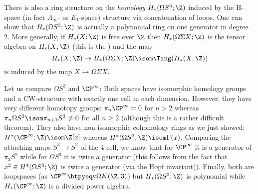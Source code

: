 \begin{remark}
	There is also a ring structure on the \emph{homology} $H_*(\Omega S^3; \Z)$ induced by the H-space (in fact $A_\infty$- or $E_1$-space) structure via concatenation of loops.
	One can show that $H_*(\Omega S^3; \Z)$ is actually a polynomial ring on one generator in degree 2.
	More generally, if $H_*(X; \Z)$ is free over $\Z$ then $H_*(\Omega \Sigma X; \Z)$ is the tensor algebra on $H_*(X; \Z)$ (this is the ) and the map
	\begin{equation*}
		H_*(X; \Z) \to H_*(\Omega \Sigma X; \Z) \isom \Tang(H_*(X; \Z))
	\end{equation*} 
	is induced by the map $X \to \Omega \Sigma X$.
\end{remark}
\begin{remark}
	Let us compare $\Omega S^3$ and $\CP^\infty$:
	Both spaces have isomorphic homology groups and a CW-structure with exactly one cell in each dimension.
	However, they have very different homotopy groups: $\pi_n \CP^\infty = 0$ for $n > 2$ whereas $\pi_n \Omega S^3 \isom \pi_{n + 1} S^3 \neq 0$ for all $n \geq 2$ (although this is a rather difficult theorem).
	They also have non-isomorphic cohomology rings as we just showed: $H^*(\CP^\infty; \Z) \isom \Z[x]$ whereas $H^*(\Omega S^3; \Z) \isom \Gamma(x)$.
	Comparing the attaching maps $S^3 \to S^2$ of the 4-cell, we know that for $\CP^\infty$ it is a generator of $\pi_3 S^2$ while for $\Omega S^3$ it is twice a generator (this follows from the fact that $x^2 \in H^4(\Omega S^3; \Z)$ is twice a generator (via the Hopf invariant)).
	Finally, both are loopspaces (as $\CP^\infty \htpyeqv \Omega K(\Z, 3)$) but $H_*(\Omega S^3; \Z)$ is polynomial while $H_*(\CP^\infty; \Z)$ is a divided power algebra.
\end{remark}
